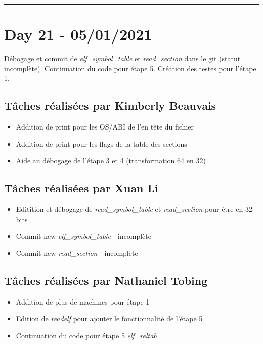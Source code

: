 \documentclass[11pt,letterpaper]{article}
\begin{document}
\noindent\rule{13cm}{0.4pt}

\section*{Day 21 - 05/01/2021}
Débogage et commit de \textit{elf\_symbol\_table} et \textit{read\_section} 
dans le git (statut incomplète). Continuation du code pour étape 5. Création 
des testes pour l'étape 1.

\subsection*{Tâches réalisées par Kimberly Beauvais}
\begin{itemize}
    \item Addition de print pour les OS/ABI de l'en tête du fichier
    \item Addition de print pour les flags de la table des sections
    \item Aide au débogage de l'étape 3 et 4 (transformation 64 en 32)
\end{itemize}

\subsection*{Tâches réalisées par Xuan Li}
\begin{itemize}
    \item Editition et débogage de \textit{read\_symbol\_table} et 
    \textit{read\_section} pour être en 32 bits
    \item Commit new \textit{elf\_symbol\_table} - incomplète
    \item Commit new \textit{read\_section} - incomplète
\end{itemize}

\subsection*{Tâches réalisées par Nathaniel Tobing}
\begin{itemize}
    \item Addition de plus de machines pour étape 1
    \item Edition de \textit{readelf} pour ajouter le fonctionnalité de l'étape 5
    \item Continuation du code pour étape 5 \textit{elf\_reltab}
\end{itemize}
\end{document}
